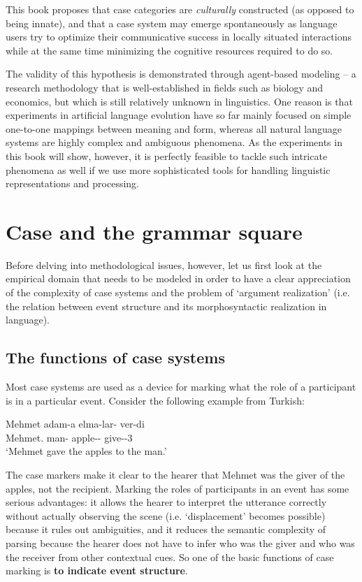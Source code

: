 This book proposes that case categories are {\em culturally} constructed (as opposed to being innate), and that a case system may emerge spontaneously as language users try to optimize their communicative success in locally situated interactions while at the same time minimizing the cognitive resources required to do so. 

The validity of this hypothesis is demonstrated through agent-based modeling -- a research methodology that is well-established in fields such as biology and economics, but which is still relatively unknown in linguistics. One reason is that experiments in artificial language evolution have so far mainly focused on simple one-to-one mappings between meaning and form, whereas all natural language systems are highly complex and ambiguous phenomena. As the experiments in this book will show, however, it is perfectly feasible to tackle such intricate phenomena as well if we use more sophisticated tools for handling linguistic representations and processing. 

\section{Case and the grammar square}
\label{s:grammar-square}

Before delving into methodological issues, however, let us first look at the empirical domain that needs to be modeled in order to have a clear appreciation of the complexity of case systems and the problem of `argument realization' (i.e. the relation between event structure and its morphosyntactic realization in language).

\subsection{The functions of case systems}
\label{s:case-functions}

Most case systems are used as a device for marking what the role of a participant is in a particular event. Consider the following example from Turkish:

\label{e:case1}
\ea
\gll Mehmet adam-a elma-lar-{\em \textiota} ver-di \\
	Mehmet.{\nom} man-{\dat} apple-{\pl}-{\acc} give-{\pst}-3{\sg} \\
\glt `Mehmet gave the apples to the man.' \citep[1, example 1]{blake94case}
\z

The case markers make it clear to the hearer that Mehmet was the giver of the apples, not the recipient. Marking the roles of participants in an event has some serious advantages: it allows the hearer to interpret the utterance correctly without actually observing the scene (i.e. `displacement' becomes possible) because it rules out ambiguities, and it reduces the semantic complexity of parsing because the hearer does not have to infer who was the giver and who was the receiver from other contextual cues. So one of the basic functions of case marking is {\bfseries to indicate event structure}.

